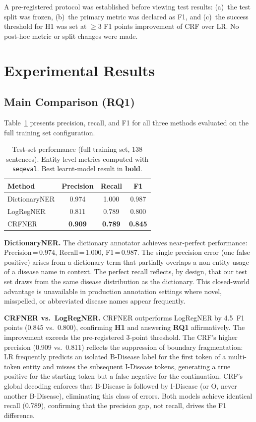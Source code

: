 \documentclass[sigconf,nonacm]{acmart}
\begin{document}
A pre-registered protocol was established before viewing test results: (a)~the test split was frozen, (b)~the primary metric was declared as F1, and (c)~the success threshold for H1 was set at $\geq$3 F1 points improvement of CRF over LR. No post-hoc metric or split changes were made.

\section{Experimental Results}

\subsection{Main Comparison (RQ1)}

Table~\ref{tab:main} presents precision, recall, and F1 for all three methods evaluated on the full training set configuration.

\begin{table}[h]
\centering
\caption{Test-set performance (full training set, 138 sentences). Entity-level metrics computed with \texttt{seqeval}. Best learnt-model result in \textbf{bold}.}
\label{tab:main}
\begin{tabular}{lccc}
\toprule
Method        & Precision & Recall & F1 \\
\midrule
DictionaryNER & 0.974     & 1.000  & 0.987 \\
LogRegNER     & 0.811     & 0.789  & 0.800 \\
CRFNER        & \textbf{0.909} & \textbf{0.789} & \textbf{0.845} \\
\bottomrule
\end{tabular}
\end{table}

\textbf{DictionaryNER.} The dictionary annotator achieves near-perfect performance: Precision\,=\,0.974, Recall\,=\,1.000, F1\,=\,0.987. The single precision error (one false positive) arises from a dictionary term that partially overlaps a non-entity usage of a disease name in context. The perfect recall reflects, by design, that our test set draws from the same disease distribution as the dictionary. This closed-world advantage is unavailable in production annotation settings where novel, misspelled, or abbreviated disease names appear frequently.

\textbf{CRFNER vs.\ LogRegNER.} CRFNER outperforms LogRegNER by 4.5~F1 points (0.845 vs.\ 0.800), confirming \textbf{H1} and answering \textbf{RQ1} affirmatively. The improvement exceeds the pre-registered 3-point threshold. The CRF's higher precision (0.909 vs.\ 0.811) reflects the suppression of boundary fragmentation: LR frequently predicts an isolated B-Disease label for the first token of a multi-token entity and misses the subsequent I-Disease tokens, generating a true positive for the starting token but a false negative for the continuation. CRF's global decoding enforces that B-Disease is followed by I-Disease (or O, never another B-Disease), eliminating this class of errors. Both models achieve identical recall (0.789), confirming that the precision gap, not recall, drives the F1 difference.
\end{document}
